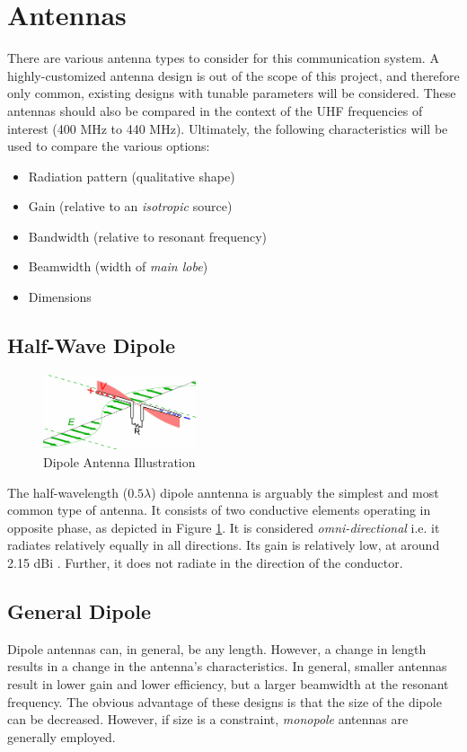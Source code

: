 \graphicspath{{./figures}}

\section{Antennas}

There are various antenna types to consider for this communication system. A highly-customized antenna design is out of the scope of this project, and therefore only common, existing designs with tunable parameters will be considered. These antennas should also be compared in the context of the UHF frequencies of interest (400 MHz to 440 MHz). Ultimately, the following characteristics will be used to compare the various options:
\begin{itemize}
    \item Radiation pattern (qualitative shape)
    \item Gain (relative to an \textit{isotropic} source) 
    \item Bandwidth (relative to resonant frequency)
    \item Beamwidth (width of \textit{main lobe})
    \item Dimensions
\end{itemize}

\subsection{Half-Wave Dipole}
\begin{figure}[!htb]
  \centering
  \includegraphics[width=0.4\textwidth]{dipole}
  \caption{Dipole Antenna Illustration \cite{site-designingDipole}}
  \label{fig:dipole}
\end{figure}

The half-wavelength ($0.5 \lambda$) dipole anntenna is arguably the simplest and most common type of antenna. It consists of two conductive elements operating in opposite phase, as depicted in Figure \ref{fig:dipole}. It is considered \textit{omni-directional} i.e. it radiates relatively equally in all directions. Its gain is relatively low, at around 2.15 dBi \cite{site-antennaTheory}. Further, it does not radiate in the direction of the conductor.

\subsection{General Dipole}
Dipole antennas can, in general, be any length. However, a change in length results in a change in the antenna's characteristics. In general, smaller antennas result in lower gain and lower efficiency, but a larger beamwidth at the resonant frequency. The obvious advantage of these designs is that the size of the dipole can be decreased. However, if size is a constraint, \textit{monopole} antennas are generally employed.

